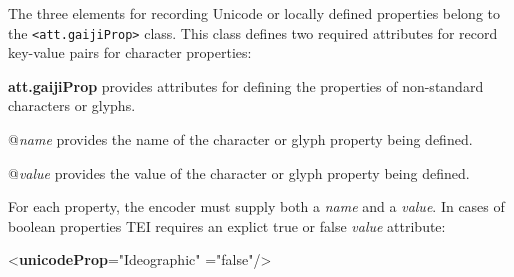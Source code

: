 The three elements for recording Unicode or locally defined properties belong to the \texttt{<att.gaijiProp>} class. This class defines two required attributes for record key-value pairs for character properties:  
\begin{sansreflist}
  
\item [\textbf{att.gaijiProp}] provides attributes for defining the properties of non-standard characters or glyphs. \hfil\\[-10pt]\begin{sansreflist}
    \item[@{\itshape name}]
  provides the name of the character or glyph property being defined.
    \item[@{\itshape value}]
  provides the value of the character or glyph property being defined.
\end{sansreflist}  
\end{sansreflist}
 For each property, the encoder must supply both a {\itshape name} and a {\itshape value}. In cases of boolean properties TEI requires an explict true or false {\itshape value} attribute: \par\bgroup{}\exampleFont \begin{shaded}\noindent\mbox{}{<\textbf{unicodeProp}\hspace*{1em}{name}="{Ideographic}"\mbox{}\newline 
\hspace*{1em}{value}="{false}"/>}\end{shaded}\egroup\par \par
